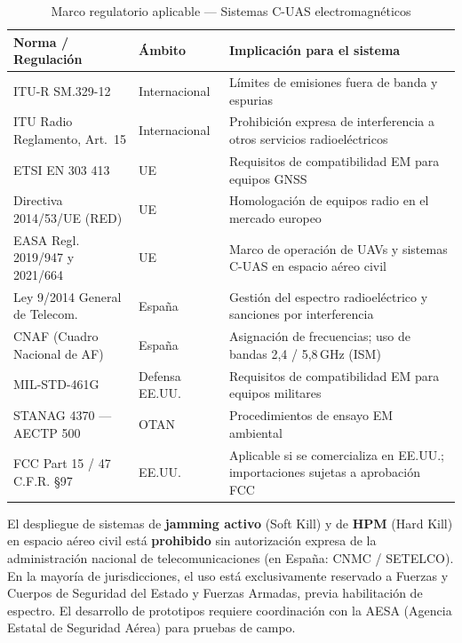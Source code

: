 \documentclass[12pt,a4paper]{article}
\begin{document}
\begin{table}[H]
\centering
\caption{Marco regulatorio aplicable — Sistemas C-UAS electromagnéticos}
\label{tab:regulatorio}
\renewcommand{\arraystretch}{1.25}
\begin{tabularx}{\textwidth}{llX}
\toprule
\textbf{Norma / Regulación} &
\textbf{Ámbito} &
\textbf{Implicación para el sistema} \\
\midrule
ITU-R SM.329-12 &
  Internacional &
  Límites de emisiones fuera de banda y espurias \\[3pt]

ITU Radio Reglamento, Art.~15 &
  Internacional &
  Prohibición expresa de interferencia a otros servicios
  radioeléctricos \\[3pt]

ETSI EN 303 413 &
  UE &
  Requisitos de compatibilidad EM para equipos GNSS \\[3pt]

Directiva 2014/53/UE (RED) &
  UE &
  Homologación de equipos radio en el mercado europeo \\[3pt]

EASA Regl. 2019/947 y 2021/664 &
  UE &
  Marco de operación de UAVs y sistemas C-UAS en espacio aéreo civil \\[3pt]

Ley 9/2014 General de Telecom. &
  España &
  Gestión del espectro radioeléctrico y sanciones por interferencia \\[3pt]

CNAF (Cuadro Nacional de AF) &
  España &
  Asignación de frecuencias; uso de bandas 2,4 / 5,8\,GHz (ISM) \\[3pt]

MIL-STD-461G &
  Defensa EE.UU. &
  Requisitos de compatibilidad EM para equipos militares \\[3pt]

STANAG 4370 — AECTP 500 &
  OTAN &
  Procedimientos de ensayo EM ambiental \\[3pt]

FCC Part 15 / 47 C.F.R. §97 &
  EE.UU. &
  Aplicable si se comercializa en EE.UU.; importaciones sujetas a
  aprobación FCC \\
\bottomrule
\end{tabularx}
\end{table}

\begin{correccion}
  El despliegue de sistemas de \textbf{jamming activo} (Soft Kill) y
  de \textbf{HPM} (Hard Kill) en espacio aéreo civil está
  \textbf{prohibido} sin autorización expresa de la administración
  nacional de telecomunicaciones (en España: CNMC / SETELCO).
  En la mayoría de jurisdicciones, el uso está exclusivamente reservado
  a Fuerzas y Cuerpos de Seguridad del Estado y Fuerzas Armadas,
  previa habilitación de espectro.
  El desarrollo de prototipos requiere coordinación con la AESA
  (Agencia Estatal de Seguridad Aérea) para pruebas de campo.
\end{correccion}
\end{document}
